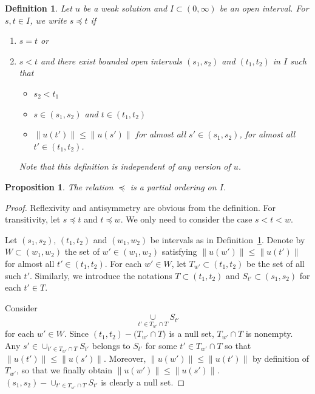 \documentclass[10pt,a4paper]{amsart}
\newtheorem{definition}{Definition}
\newtheorem{prop}{Proposition}
\begin{document}
\begin{definition}
\label{partial order def}
  Let $u$ be a weak solution and $I \subset (0,\infty)$ be an open interval. For $s,t \in I$, we write $s \preceq t$ if
\begin{enumerate}
    \item $s=t$ or

    \item $s< t$ and  there exist bounded open intervals $(s_1, s_2)$ and $(t_1, t_2)$ in $I$ such that \begin{itemize}
    \item $s_2 < t_1$
      \item $s \in (s_1, s_2)$ and $t \in (t_1, t_2)$
      \item $\lVert u(t') \rVert \leq \lVert u(s') \rVert$ for almost all $s' \in (s_1, s_2)$, for almost all $t' \in (t_1, t_2)$.
  \end{itemize} 
  Note that this definition is independent of any version of $u$.
\end{enumerate}
  
   
 
\end{definition}

\begin{prop}
    The relation $\preceq$ is a partial ordering on $I$.
\end{prop}

\begin{proof}
    Reflexivity and antisymmetry are obvious from the definition. For transitivity, let $s \preceq t$ and $t \preceq w$. We only need to consider the case $s < t < w$. 

   Let $(s_1, s_2)$, $(t_1, t_2)$ and $(w_1, w_2)$ be intervals as in Definition~\ref{partial order def}. Denote by $W \subset (w_1, w_2)$ the set of $w' \in (w_1, w_2)$ satisfying $\lVert u(w') \rVert \leq \lVert u(t') \rVert$ for almost all $t' \in (t_1,t_2)$. For each $w' \in W$, let $T_{w'} \subset (t_1,t_2)$ be the set of all such $t'$. Similarly, we introduce the notations $T \subset (t_1,t_2)$ and $S_{t'} \subset (s_1,s_2)$ for each $t' \in T$.


Consider 
\begin{equation*}
\underset{t' \in T_{w'} \cap T}{\cup}  S_{t'}    
\end{equation*}
for each $w' \in W$. Since $(t_1,t_2) - \bigl( T_{w'} \cap T \bigr)$ is a null set, $T_{w'} \cap T$ is nonempty. Any $s' \in \cup_{t' \in T_{w'} \cap T}  S_{t'}$ belongs to $S_{t'}$ for some $t' \in T_{w'} \cap T$ so that $\lVert u(t') \rVert \leq \lVert u(s') \rVert$. Moreover,  $\lVert u(w') \rVert \leq \lVert u(t') \rVert$ by definition of $T_{w'}$, so that we finally obtain  $\lVert u(w') \rVert \leq \lVert u(s') \rVert$. $(s_1,s_2) - \cup_{t' \in T_{w'} \cap T}  S_{t'}$ is clearly a null set.
\end{proof}
\end{document}
